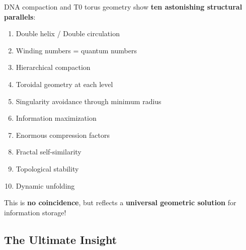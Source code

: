 	\begin{keyresult}
		DNA compaction and T0 torus geometry show \textbf{ten astonishing structural parallels}:
		
		\vspace{0.3cm}
		
		\begin{enumerate}
			\item Double helix / Double circulation
			\item Winding numbers = quantum numbers
			\item Hierarchical compaction
			\item Toroidal geometry at each level
			\item Singularity avoidance through minimum radius
			\item Information maximization
			\item Enormous compression factors
			\item Fractal self-similarity
			\item Topological stability
			\item Dynamic unfolding
		\end{enumerate}
		
		\vspace{0.3cm}
		
		This is \textbf{no coincidence}, but reflects a \textbf{universal geometric solution} for information storage!
	\end{keyresult}
	
	\subsection{The Ultimate Insight}
	
